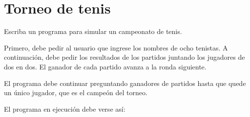 \section{Torneo de tenis}

Escriba un programa para simular un campeonato de tenis.

Primero, debe pedir al usuario que ingrese los nombres de ocho tenistas.
A continuación, debe pedir los resultados de los partidos juntando los
jugadores de dos en dos. El ganador de cada partido avanza a la ronda
siguiente.

El programa debe continuar preguntando ganadores de partidos hasta que
quede un único jugador, que es el campeón del torneo.

El programa en ejecución debe verse así:
